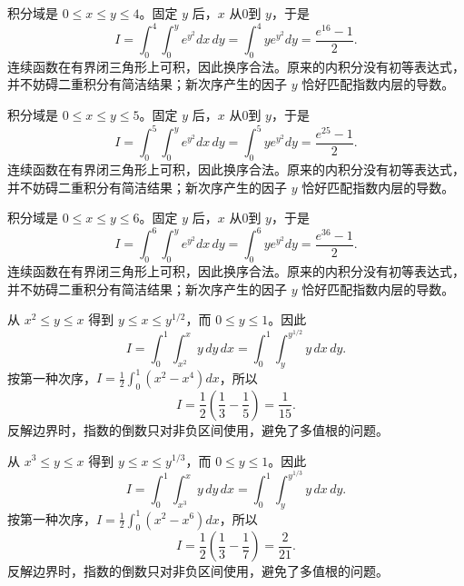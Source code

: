 \documentclass[UTF8,12pt,a4paper,fontset=fandol]{ctexart}
\begin{document}
\begin{solve}\label{ans:c37q4}
积分域是 $0\le x\le y\le 4$。固定 $y$ 后，$x$ 从0到 $y$，于是
\[
I=\int_0^{4}\int_0^y e^{y^2}dx\,dy=\int_0^{4}y e^{y^2}dy=\frac{e^{16}-1}2.
\]
连续函数在有界闭三角形上可积，因此换序合法。原来的内积分没有初等表达式，并不妨碍二重积分有简洁结果；新次序产生的因子 $y$ 恰好匹配指数内层的导数。
\end{solve}

\begin{solve}\label{ans:c37q5}
积分域是 $0\le x\le y\le 5$。固定 $y$ 后，$x$ 从0到 $y$，于是
\[
I=\int_0^{5}\int_0^y e^{y^2}dx\,dy=\int_0^{5}y e^{y^2}dy=\frac{e^{25}-1}2.
\]
连续函数在有界闭三角形上可积，因此换序合法。原来的内积分没有初等表达式，并不妨碍二重积分有简洁结果；新次序产生的因子 $y$ 恰好匹配指数内层的导数。
\end{solve}

\begin{solve}\label{ans:c37q6}
积分域是 $0\le x\le y\le 6$。固定 $y$ 后，$x$ 从0到 $y$，于是
\[
I=\int_0^{6}\int_0^y e^{y^2}dx\,dy=\int_0^{6}y e^{y^2}dy=\frac{e^{36}-1}2.
\]
连续函数在有界闭三角形上可积，因此换序合法。原来的内积分没有初等表达式，并不妨碍二重积分有简洁结果；新次序产生的因子 $y$ 恰好匹配指数内层的导数。
\end{solve}

\begin{solve}\label{ans:c37q7}
从 $x^{2}\le y\le x$ 得到 $y\le x\le y^{1/2}$，而 $0\le y\le1$。因此
\[
I=\int_0^1\int_{x^{2}}^x y\,dy\,dx=\int_0^1\int_y^{y^{1/2}}y\,dx\,dy.
\]
按第一种次序，$I=\frac12\int_0^1(x^2-x^{4})dx$，所以
\[
I=\frac12\left(\frac13-\frac1{5}\right)=\frac{1}{15}.
\]
反解边界时，指数的倒数只对非负区间使用，避免了多值根的问题。
\end{solve}

\begin{solve}\label{ans:c37q8}
从 $x^{3}\le y\le x$ 得到 $y\le x\le y^{1/3}$，而 $0\le y\le1$。因此
\[
I=\int_0^1\int_{x^{3}}^x y\,dy\,dx=\int_0^1\int_y^{y^{1/3}}y\,dx\,dy.
\]
按第一种次序，$I=\frac12\int_0^1(x^2-x^{6})dx$，所以
\[
I=\frac12\left(\frac13-\frac1{7}\right)=\frac{2}{21}.
\]
反解边界时，指数的倒数只对非负区间使用，避免了多值根的问题。
\end{solve}
\end{document}
